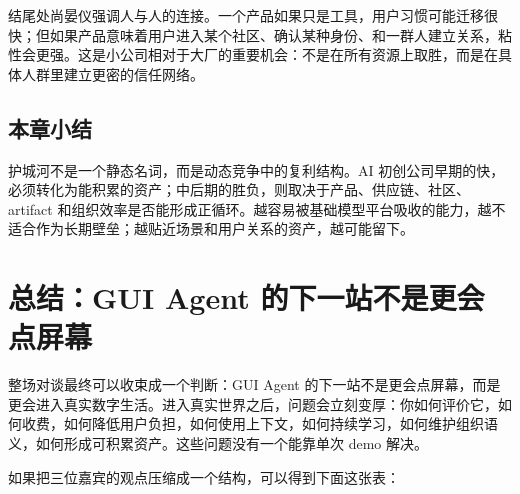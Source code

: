\documentclass[a4paper]{article}
\begin{document}
结尾处尚晏仪强调人与人的连接。一个产品如果只是工具，用户习惯可能迁移很快；但如果产品意味着用户进入某个社区、确认某种身份、和一群人建立关系，粘性会更强。这是小公司相对于大厂的重要机会：不是在所有资源上取胜，而是在具体人群里建立更密的信任网络。

\subsection{本章小结}

护城河不是一个静态名词，而是动态竞争中的复利结构。AI 初创公司早期的快，必须转化为能积累的资产；中后期的胜负，则取决于产品、供应链、社区、artifact 和组织效率是否能形成正循环。越容易被基础模型平台吸收的能力，越不适合作为长期壁垒；越贴近场景和用户关系的资产，越可能留下。

\section{总结：GUI Agent 的下一站不是更会点屏幕}

整场对谈最终可以收束成一个判断：GUI Agent 的下一站不是更会点屏幕，而是更会进入真实数字生活。进入真实世界之后，问题会立刻变厚：你如何评价它，如何收费，如何降低用户负担，如何使用上下文，如何持续学习，如何维护组织语义，如何形成可积累资产。这些问题没有一个能靠单次 demo 解决。

如果把三位嘉宾的观点压缩成一个结构，可以得到下面这张表：
\end{document}
